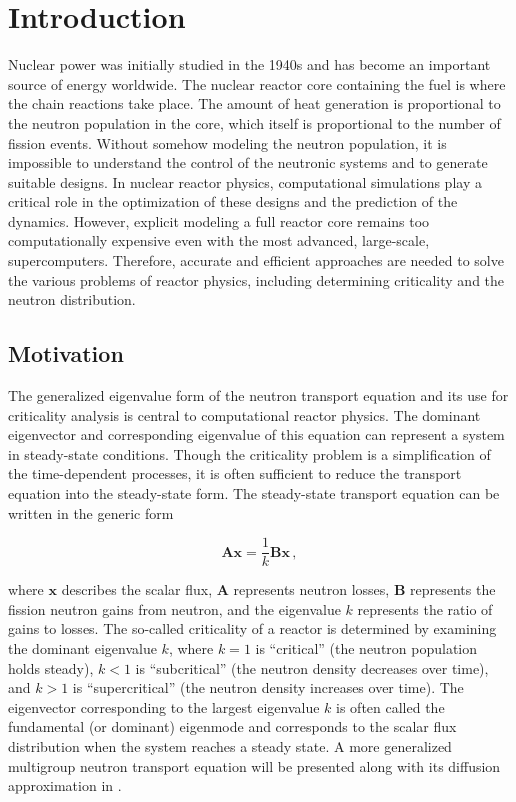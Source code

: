 \cleardoublepage

\chapter{Introduction}
\label{chapter:intro}
Nuclear power was initially studied in the 1940s and has become an important source of energy worldwide.
The nuclear reactor core containing the fuel is where the chain reactions take place.
The amount of heat generation is proportional to the neutron population in the core, which itself is proportional to the number of fission events. 
Without somehow modeling the neutron population, it is impossible to understand the control of the neutronic systems and to generate suitable designs. 
In nuclear reactor physics, computational simulations play a critical role in the optimization of these designs and the prediction of the dynamics.
However, explicit modeling a full reactor core remains too computationally expensive even with the most advanced, large-scale, supercomputers. 
Therefore, accurate and efficient approaches are needed to solve the various problems of reactor physics, including determining criticality and the neutron distribution.

\section{Motivation}

The generalized eigenvalue form of the neutron transport equation and its use for criticality analysis is central to computational reactor physics.
The dominant eigenvector and corresponding eigenvalue of this equation can represent a system in steady-state conditions.
Though the criticality problem is a simplification of the time-dependent processes, it is often sufficient to reduce the transport equation into the steady-state form. 
The steady-state transport equation can be written in the generic form

\begin{equation}
 \mathbf{Ax} = \frac{1}{k} \mathbf{Bx}  \, ,
 \label{eq:Axb}
\end{equation}

where $\mathbf{x}$ describes the scalar flux, $\mathbf{A}$ represents neutron losses,  $\mathbf{B}$ represents the fission neutron gains from neutron, and the eigenvalue $k$ represents the ratio of gains to losses.
The so-called criticality of a reactor is determined by examining the dominant eigenvalue $k$, where $k=1$ is ``critical'' (the neutron population holds steady), $k<1$ is ``subcritical'' (the neutron density decreases over time), and $k > 1$ is ``supercritical'' (the neutron density increases over time).
The eigenvector corresponding to the largest eigenvalue $k$ is often called the fundamental (or dominant) eigenmode and corresponds to the scalar flux distribution when the system reaches a steady state.
A more generalized multigroup neutron transport equation will be presented along with its diffusion approximation in .

